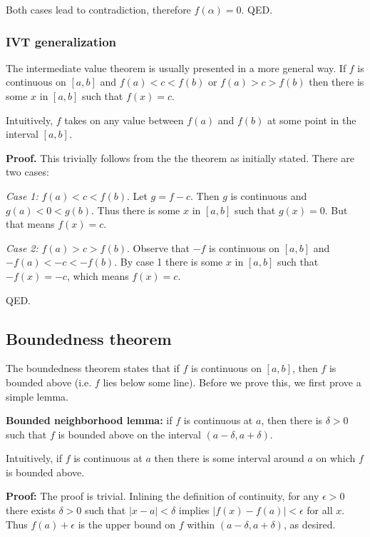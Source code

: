 \vs

Both cases lead to contradiction, therefore $f(\alpha)=0$. QED.

\subsubsection*{IVT generalization}

The intermediate value theorem is usually presented in a more
general way. If $f$ is continuous on $[a,b]$ and $f(a)<c<f(b)$ or
$f(a)>c>f(b)$ then there is some $x$ in $[a,b]$ such that $f(x)=c$.

\vs

Intuitively, $f$ takes on any value between $f(a)$ and $f(b)$ at some
point in the interval $[a,b]$.

\vs

\textbf{Proof.} This trivially follows from the the theorem as
initially stated. There are two cases:

\vs

\textit{Case 1:} $f(a)<c<f(b)$. Let $g=f-c$. Then $g$ is continuous
and $g(a)<0<g(b)$. Thus there is some $x$ in $[a,b]$ such that
$g(x)=0$. But that means $f(x)=c$.

\vs

\textit{Case 2:} $f(a)>c>f(b)$. Observe that $-f$ is continuous on
$[a,b]$ and $-f(a)<-c<-f(b)$. By case 1 there is some $x$ in $[a,b]$
such that $-f(x)=-c$, which means $f(x)=c$.

\vs

QED.

\subsection{Boundedness theorem}

The boundedness theorem states that if $f$ is continuous on $[a,b]$,
then $f$ is bounded above (i.e. $f$ lies below some line). Before we
prove this, we first prove a simple lemma.

\vs

\textbf{Bounded neighborhood lemma:} if $f$ is continuous at $a$, then
there is $\delta>0$ such that $f$ is bounded above on the interval
$(a-\delta, a+\delta)$.

\vs

Intuitively, if $f$ is continuous at $a$ then there is some interval
around $a$ on which $f$ is bounded above.

\vs

\textbf{Proof:} The proof is trivial. Inlining the definition of
continuity, for any $\epsilon>0$ there exists $\delta>0$ such that
$|x-a|<\delta$ implies $|f(x)-f(a)|<\epsilon$ for all $x$. Thus
$f(a)+\epsilon$ is the upper bound on $f$ within $(a-\delta, a+\delta)$, as desired.

